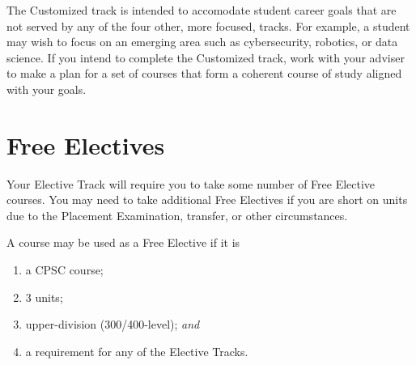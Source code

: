 \documentclass{book}
\begin{document}
The Customized track is intended to accomodate student career goals that are not served by any of the four other, more focused, tracks. For example, a student may wish to focus on an emerging area such as cybersecurity, robotics, or data science. If you intend to complete the Customized track, work with your adviser to make a plan for a set of courses that form a coherent course of study aligned with your goals.

\section{Free Electives}
\label{section:free_electives}

Your Elective Track will require you to take some number of Free Elective courses. You may need to take additional Free Electives if you are short on units due to the Placement Examination, transfer, or other circumstances.

A course may be used as a Free Elective if it is
\begin{enumerate}
\item a CPSC course;
\item 3 units;
\item upper-division (300/400-level); \emph{and}
\item a requirement for any of the Elective Tracks.
\end{enumerate}
\end{document}

